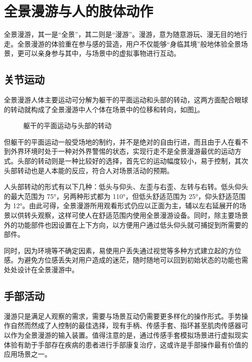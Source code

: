 \section{全景漫游与人的肢体动作}

全景漫游，其一是“全景”，其二则是“漫游”。漫游，意为随意游玩、漫无目的地行走。全景漫游的体验重在参与感的营造，用户不仅能够“身临其境”般地体验全景场景，更可以亲身参与其中，与场景中的虚拟事物进行互动。

\subsection{关节运动}

全景漫游人体主要运动可分解为躯干的平面运动和头部的转动，这两方面配合眼球的转动就构成了全景漫游中人个体在场景中的位移和转向，如图\ref{fig:act}。

\begin{figure}[htp]
\centering
{}
\caption{躯干的平面运动与头部的转动}
\label{fig:act}
\end{figure}

但躯干的平面运动一般受场地的制约，并不是绝对的自由行进，而且由于人在看不到外界环境时处于一种对外界警惕的状态，实现行走不是全景漫游最优的运动方式。头部的转动则是一种比较好的选择，首先它的运动幅度较小，易于控制，其次头部转动也是人本能的反应，符合人对场景活动的预期。

人头部转动的形式有以下几种：低头与仰头、左歪与右歪、左转与右转。低头仰头的最大范围为 75°，另两种形式都为 110°，但低头舒适范围为 25°，仰头舒适范围为 12°。由此可得，全景漫游所用观看形式仍应以正面为主，辅以左右延展开的场景以供转头观察，这样可使人在舒适范围内使用全景漫游设备。同时，除主要场景外的功能部件也因设置在上下方向，以方便用户通过低头仰头就可捕捉到所需要的部件。

同时，因为环境等不确定因素，易使用户丢失通过视觉等多种方式建立起的方位感。为避免方位感丢失对用户造成的迷茫，随时随地可以回到初始状态的功能也需处处设计在全景漫游中。

\subsection{手部活动}

漫游只是满足人观察的需求，需要与场景互动仍需要更多样化的操作形式。手势操作自然而然成了人控制的最佳选择，现有手柄、传感手套、指环甚至肌肉传感器可以作为全景漫游的输入装置。值得注意的是，通过传感手套模拟场景进行虚拟现实体验有助于手部存在疾病的患者进行手部康复治疗，这或许是手部操作最有价值的应用场景之一。

